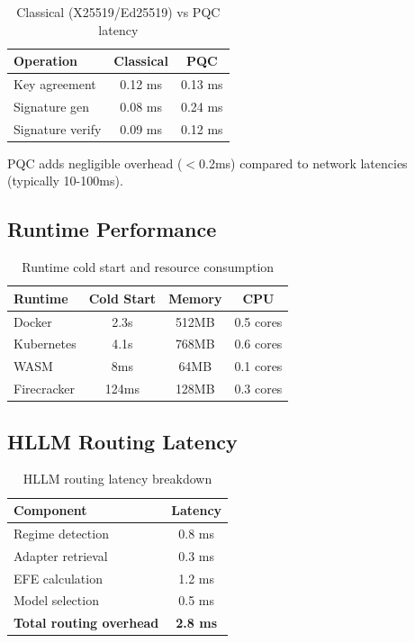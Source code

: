 \begin{table}[h]
\centering
\small
\begin{tabular}{|l|c|c|}
\hline
\textbf{Operation} & \textbf{Classical} & \textbf{PQC} \\
\hline
Key agreement & 0.12 ms & 0.13 ms \\
Signature gen & 0.08 ms & 0.24 ms \\
Signature verify & 0.09 ms & 0.12 ms \\
\hline
\end{tabular}
\caption{Classical (X25519/Ed25519) vs PQC latency}
\label{tab:pqc_overhead}
\end{table}

PQC adds negligible overhead ($<$0.2ms) compared to network latencies (typically 10-100ms).

\subsection{Runtime Performance}

\begin{table}[h]
\centering
\small
\begin{tabular}{|l|c|c|c|}
\hline
\textbf{Runtime} & \textbf{Cold Start} & \textbf{Memory} & \textbf{CPU} \\
\hline
Docker & 2.3s & 512MB & 0.5 cores \\
Kubernetes & 4.1s & 768MB & 0.6 cores \\
WASM & 8ms & 64MB & 0.1 cores \\
Firecracker & 124ms & 128MB & 0.3 cores \\
\hline
\end{tabular}
\caption{Runtime cold start and resource consumption}
\label{tab:runtime_perf}
\end{table}

\subsection{HLLM Routing Latency}

\begin{table}[h]
\centering
\begin{tabular}{|l|c|}
\hline
\textbf{Component} & \textbf{Latency} \\
\hline
Regime detection & 0.8 ms \\
Adapter retrieval & 0.3 ms \\
EFE calculation & 1.2 ms \\
Model selection & 0.5 ms \\
\textbf{Total routing overhead} & \textbf{2.8 ms} \\
\hline
\end{tabular}
\caption{HLLM routing latency breakdown}
\label{tab:hllm_latency}
\end{table}

